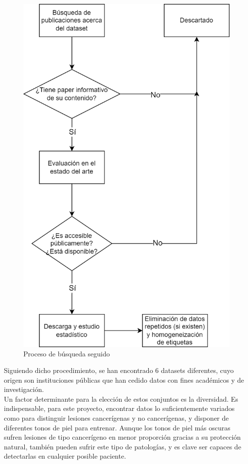 \begin{figure}[H]
	\centering
	\includegraphics[scale=0.75]{imagenes/DiagramaBusqueda.png}
	\caption{Proceso de búsqueda seguido}
\end{figure}

Siguiendo dicho procedimiento, se han encontrado 6 datasets diferentes, cuyo origen son instituciones públicas que han cedido datos con fines académicos y de investigación.\\

Un factor determinante para la elección de estos conjuntos es la diversidad. Es indispensable, para este proyecto, encontrar datos lo suficientemente variados como para distinguir lesiones cancerígenas y no cancerígenas, y disponer de diferentes tonos de piel para entrenar. Aunque los tonos de piel más oscuras sufren lesiones de tipo cancerígeno en menor proporción gracias a su protección natural, también pueden sufrir este tipo de patologías, y es clave ser capaces de detectarlas en cualquier posible paciente.

